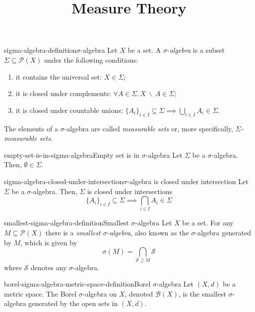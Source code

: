 \documentclass[preview]{standalone}
\begin{document}
\title{Measure Theory}
\genpage


\begin{snippetdefinition}{sigma-algebra-definition}{\(\sigma\)-algebra}
    Let \(X\) be a set.
    A \(\sigma\)-\textit{algebra} is a subset \(\Sigma \subseteq \mathcal{P}(X)\)
    under the following conditions:
    \begin{enumerate}
        \item it contains the universal set: \(X \in \Sigma\);
        \item it is closed under complements: \(\forall A \in \Sigma, X \,\backslash\, A \in \Sigma\);
        \item it is closed under countable unions: \({\{A_i\}}_{i \in I} \subseteq \Sigma \implies \bigcup_{i \in I} A_i \in \Sigma \).
    \end{enumerate}
    The elements of a \(\sigma\)-algebra are called \textit{measurable sets}
    or, more specifically, \textit{\(\Sigma\)-measurable sets}.
\end{snippetdefinition}

\begin{snippetcorollary}{empty-set-is-in-sigma-algebra}{Empty set is in \(\sigma\)-algebra}
    Let \(\Sigma\) be a \(\sigma\)-algebra. Then, \(\emptyset \in \Sigma\).
\end{snippetcorollary}

\begin{snippetcorollary}{sigma-algebra-closed-under-intersection}{\(\sigma\)-algebra is closed under intersection}
    Let \(\Sigma\) be a \(\sigma\)-algebra. Then, \(\Sigma\) is closed under intersections
    \[
        {\{A_i\}}_{i \in I} \subseteq \Sigma \implies \bigcap_{i \in I} A_i \in \Sigma
    \]
\end{snippetcorollary}

\begin{snippetdefinition}{smallest-sigma-algebra-definition}{Smallest \(\sigma\)-algebra}
    Let \(X\) be a set. For any \(M \subseteq \mathcal{P}(X)\)
    there is a \textit{smallest \(\sigma\)-algebra}, also known as the
    \(\sigma\)-algebra generated by \(M\), which is given by
    \[ \sigma(M) = \bigcap_{\mathcal{S} \supseteq M} \mathcal{S} \]
    where \(\mathcal{S}\) denotes any \(\sigma\)-algebra.
\end{snippetdefinition}

\begin{snippetdefinition}{borel-sigma-algebra-metric-space-definition}{Borel \(\sigma\)-algebra}
    Let \((X, d)\) be a metric space.
    The Borel \(\sigma\)-algebra on \(X\), denoted \(\mathcal{B}(X)\),
    is the smallest \(\sigma\)-algebra generated by the open sets in \((X, d)\).
\end{snippetdefinition}

\end{document}
